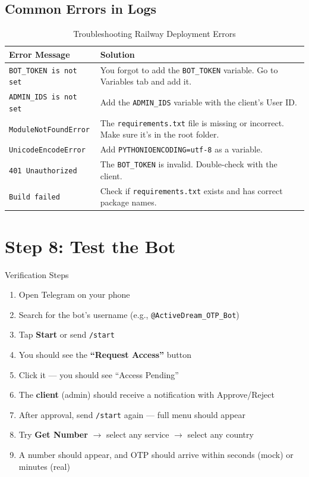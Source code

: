 \subsection{Common Errors in Logs}

\begin{table}[H]
\centering
\caption{Troubleshooting Railway Deployment Errors}
\begin{tabularx}{\textwidth}{|l|X|}
\hline
\textbf{Error Message} & \textbf{Solution} \\
\hline
\texttt{BOT\_TOKEN is not set} & You forgot to add the \texttt{BOT\_TOKEN} variable. Go to Variables tab and add it. \\
\hline
\texttt{ADMIN\_IDS is not set} & Add the \texttt{ADMIN\_IDS} variable with the client's User ID. \\
\hline
\texttt{ModuleNotFoundError} & The \texttt{requirements.txt} file is missing or incorrect. Make sure it's in the root folder. \\
\hline
\texttt{UnicodeEncodeError} & Add \texttt{PYTHONIOENCODING=utf-8} as a variable. \\
\hline
\texttt{401 Unauthorized} & The \texttt{BOT\_TOKEN} is invalid. Double-check with the client. \\
\hline
\texttt{Build failed} & Check if \texttt{requirements.txt} exists and has correct package names. \\
\hline
\end{tabularx}
\end{table}

\section{Step 8: Test the Bot}

\begin{stepbox}{Verification Steps}
\begin{enumerate}[leftmargin=1.5cm]
    \item Open Telegram on your phone
    \item Search for the bot's username (e.g., \texttt{@ActiveDream\_OTP\_Bot})
    \item Tap \textbf{Start} or send \texttt{/start}
    \item You should see the \textbf{``Request Access''} button
    \item Click it --- you should see ``Access Pending''
    \item The \textbf{client} (admin) should receive a notification with Approve/Reject
    \item After approval, send \texttt{/start} again --- full menu should appear
    \item Try \textbf{Get Number} $\rightarrow$ select any service $\rightarrow$ select any country
    \item A number should appear, and OTP should arrive within seconds (mock) or minutes (real)
\end{enumerate}
\end{stepbox}

